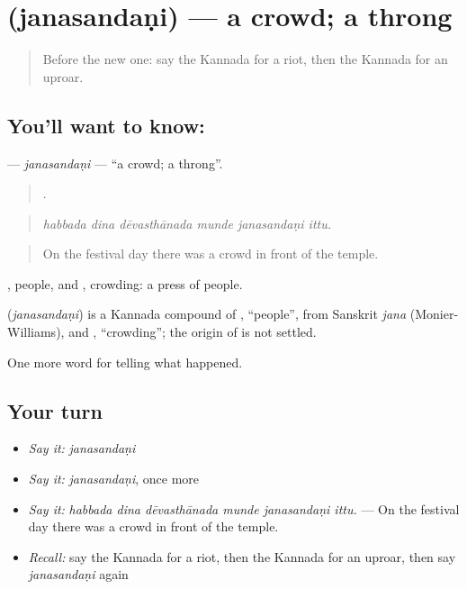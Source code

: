 \section[\texorpdfstring{\kn{ಜನಸಂದಣಿ} (janasandaṇi)}{ಜನಸಂದಣಿ (janasandaṇi)}]{ (janasandaṇi) — a crowd; a throng}

\label{lesson:KA-C339-janasandani}



\begin{quote}
Before the new one: say the Kannada for a riot, then the Kannada for an uproar.
\end{quote}

\subsection*{You'll want to know: }
\textbf{} — \emph{janasandaṇi} — \textquotedblleft{}a crowd; a throng\textquotedblright{}.

\begin{quote}
     .
\end{quote}

\begin{quote}
\emph{habbada dina dēvasthānada munde janasandaṇi ittu.}
\end{quote}

\begin{quote}
On the festival day there was a crowd in front of the temple.
\end{quote}

, people, and , crowding: a press of people.

\begin{cousinweb}
\textbf{} (\emph{janasandaṇi}) is a Kannada compound of , \textquotedblleft{}people\textquotedblright{}, from Sanskrit \emph{jana} (Monier-Williams), and , \textquotedblleft{}crowding\textquotedblright{}; the origin of  is not settled.
\end{cousinweb}

\begin{grammarlens}[title={What you've built}]
One more word for telling what happened.
\end{grammarlens}

\subsection*{Your turn}
\begin{itemize}
\raggedright
  \item \emph{Say it:} \emph{janasandaṇi}
  \item \emph{Say it:} \emph{janasandaṇi}, once more
  \item \emph{Say it:} \emph{habbada dina dēvasthānada munde janasandaṇi ittu.} — On the festival day there was a crowd in front of the temple.
  \item \emph{Recall:} say the Kannada for a riot, then the Kannada for an uproar, then say \emph{janasandaṇi} again
\end{itemize}

